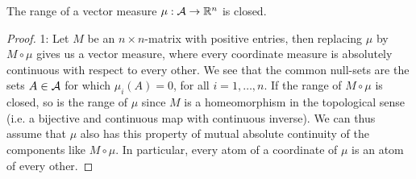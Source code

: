 \documentclass[../../main.tex]{subfiles}
\begin{document}
\begin{theorem}[Lyapunov, 1940]\label{thm: Liapunoff closed}
The range of a vector measure $\mu:\mathcal{A}\to \mathbb{R}^{n}$ is closed.
\end{theorem}
\begin{proof}
1: Let $M$ be an $n\times n$-matrix with positive entries, then replacing $\mu$ by $M\circ \mu$ gives us a vector measure, where every coordinate measure is absolutely continuous with respect to every other. We see that the common null-sets are the sets $A\in \mathcal{A}$ for which $\mu_{i}(A)=0$, for all $i=1, \dots, n$. If the range of $M\circ \mu$ is closed, so is the range of $\mu$ since $M$ is a homeomorphism in the topological sense (i.e. a bijective and continuous map with continuous inverse).
We can thus assume that $\mu$ also has this property of mutual absolute continuity of the components like $M\circ \mu$. In particular, every atom of a coordinate of $\mu$ is an atom of every other.


\end{proof}
\end{document}
